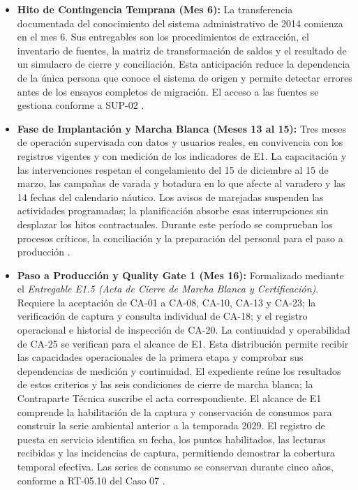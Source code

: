 \begin{itemize}
\begin{itemize}
        \parencite[cap.~15, RT-05.15]{caso07}.
    \end{itemize}
    \item \textbf{Hito de Contingencia Temprana (Mes 6):} La transferencia documentada del conocimiento del sistema administrativo de 2014 comienza en el mes 6. Sus entregables son los procedimientos de extracción, el inventario de fuentes, la matriz de transformación de saldos y el resultado de un simulacro de cierre y conciliación. Esta anticipación reduce la dependencia de la única persona que conoce el sistema de origen y permite detectar errores antes de los ensayos completos de migración. El acceso a las fuentes se gestiona conforme a SUP-02 \parencite[cap.~15, RT-05.15]{caso07}.
    \item \textbf{Fase de Implantación y Marcha Blanca (Meses 13 al 15):} Tres meses de operación supervisada con datos y usuarios reales, en convivencia con los registros vigentes y con medición de los indicadores de E1. La capacitación y las intervenciones respetan el congelamiento del 15 de diciembre al 15 de marzo, las campañas de varada y botadura en lo que afecte al varadero y las 14 fechas del calendario náutico. Los avisos de marejadas suspenden las actividades programadas; la planificación absorbe esas interrupciones sin desplazar los hitos contractuales. Durante este período se comprueban los procesos críticos, la conciliación y la preparación del personal para el paso a producción \parencite[cap.~10; cap.~15, RT-10.05]{caso07}.
    \item \textbf{Paso a Producción y Quality Gate 1 (Mes 16):} Formalizado mediante el \emph{Entregable E1.5 (Acta de Cierre de Marcha Blanca y Certificación)}. Requiere la aceptación de CA-01 a CA-08, CA-10, CA-13 y CA-23; la verificación de captura y consulta individual de CA-18; y el registro operacional e historial de inspección de CA-20. La continuidad y operabilidad de CA-25 se verifican para el alcance de E1. Esta distribución permite recibir las capacidades operacionales de la primera etapa y comprobar sus dependencias de medición y continuidad. El expediente reúne los resultados de estos criterios y las seis condiciones de cierre de marcha blanca; la Contraparte Técnica suscribe el acta correspondiente. El alcance de E1 comprende la habilitación de la captura y conservación de consumos para construir la serie ambiental anterior a la temporada 2029. El registro de puesta en servicio identifica su fecha, los puntos habilitados, las lecturas recibidas y las incidencias de captura, permitiendo demostrar la cobertura temporal efectiva. Las series de consumo se conservan durante cinco años, conforme a RT-05.10 del Caso 07 \parencite[sec.~13.2; cap.~15, RT-05.10]{caso07}.
\end{itemize}

